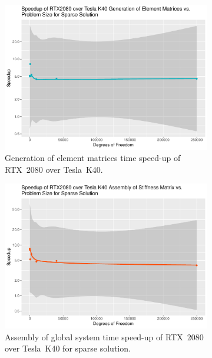 \begin{figure}
	\centering
	\begin{subfigure}{0.48\linewidth}
		\centering
		\includegraphics[width = \linewidth]{Plots/elems_rtx_speedup_vs_n}
		\caption{Generation of element matrices time speed-up of RTX~2080 over Tesla~K40.}
		\label{fig:elems_rtx}
	\end{subfigure}\hfill
	\begin{subfigure}{0.48\linewidth}
		\centering
		\includegraphics[width=\linewidth]{Plots/assem_sparse_rtx_speedup_vs_n}
		\caption{Assembly of global system time speed-up of RTX~2080 over Tesla~K40 for sparse solution.}
		\label{fig:assem_rtx_sparse}
	\end{subfigure}\\
	\begin{subfigure}{0.48\linewidth}

\end{subfigure}
\end{figure}
